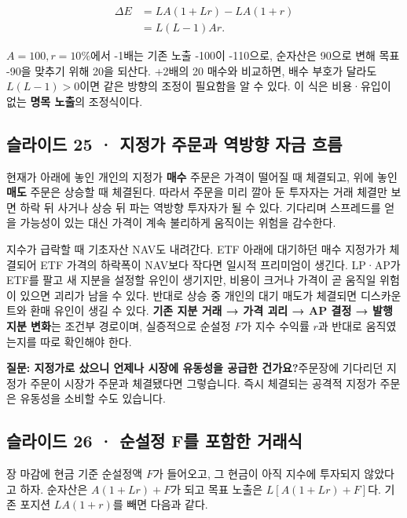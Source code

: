\documentclass[11pt,a4paper]{article}
\begin{document}
\[
\begin{aligned}
\Delta E&=LA(1+Lr)-LA(1+r)\\
&=L(L-1)Ar.
\end{aligned}
\]

$A=100,r=10\%$에서 -1배는 기존 노출 -100이 -110으로, 순자산은 90으로 변해 목표 -90을 맞추기 위해 20을 되산다. +2배의 20 매수와 비교하면, 배수 부호가 달라도 $L(L-1)>0$이면 같은 방향의 조정이 필요함을 알 수 있다. 이 식은 비용·유입이 없는 \textbf{명목 노출}의 조정식이다.\par

\subsection{슬라이드 25 · 지정가 주문과 역방향 자금 흐름}
현재가 아래에 놓인 개인의 지정가 \textbf{매수} 주문은 가격이 떨어질 때 체결되고, 위에 놓인 \textbf{매도} 주문은 상승할 때 체결된다. 따라서 주문을 미리 깔아 둔 투자자는 거래 체결만 보면 하락 뒤 사거나 상승 뒤 파는 역방향 투자자가 될 수 있다. 기다리며 스프레드를 얻을 가능성이 있는 대신 가격이 계속 불리하게 움직이는 위험을 감수한다.\par

지수가 급락할 때 기초자산 NAV도 내려간다. ETF 아래에 대기하던 매수 지정가가 체결되어 ETF 가격의 하락폭이 NAV보다 작다면 일시적 프리미엄이 생긴다. LP·AP가 ETF를 팔고 새 지분을 설정할 유인이 생기지만, 비용이 크거나 가격이 곧 움직일 위험이 있으면 괴리가 남을 수 있다. 반대로 상승 중 개인의 대기 매도가 체결되면 디스카운트와 환매 유인이 생길 수 있다. \textbf{기존 지분 거래 → 가격 괴리 → AP 결정 → 발행 지분 변화}는 조건부 경로이며, 실증적으로 순설정 $F$가 지수 수익률 $r$과 반대로 움직였는지를 따로 확인해야 한다.\par

\begin{samepage}\par\medskip\noindent\textbf{질문: 지정가로 샀으니 언제나 시장에 유동성을 공급한 건가요?}\quad 주문장에 기다리던 지정가 주문이 시장가 주문과 체결됐다면 그렇습니다. 즉시 체결되는 공격적 지정가 주문은 유동성을 소비할 수도 있습니다.\par\end{samepage}

\subsection{슬라이드 26 · 순설정 F를 포함한 거래식}
장 마감에 현금 기준 순설정액 $F$가 들어오고, 그 현금이 아직 지수에 투자되지 않았다고 하자. 순자산은 $A(1+Lr)+F$가 되고 목표 노출은 $L[A(1+Lr)+F]$다. 기존 포지션 $LA(1+r)$를 빼면 다음과 같다.\par
\end{document}
